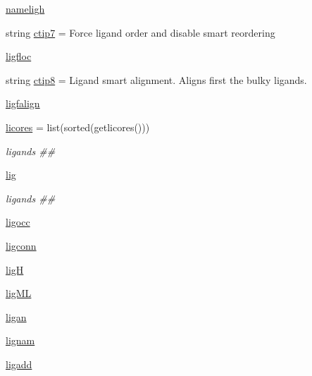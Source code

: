 \begin{DoxyCompactItemize}
\hyperlink{classmolSimplify_1_1Classes_1_1mGUI_1_1mGUI_a914adc23a74fe3fff6dbc2411ef1c77a}{nameligh}
\item 
string \hyperlink{classmolSimplify_1_1Classes_1_1mGUI_1_1mGUI_aed11e30715fd7bc36a119508a8a3a6d3}{ctip7} = \textquotesingle{}Force ligand order and disable smart reordering\textquotesingle{}
\item 
\hyperlink{classmolSimplify_1_1Classes_1_1mGUI_1_1mGUI_a33b3e0043207aa385e0d579afd7a2d81}{ligfloc}
\item 
string \hyperlink{classmolSimplify_1_1Classes_1_1mGUI_1_1mGUI_a2c8217bf3709b8acfc4c478e5834f57b}{ctip8} = \textquotesingle{}Ligand smart alignment. Aligns first the bulky ligands.\textquotesingle{}
\item 
\hyperlink{classmolSimplify_1_1Classes_1_1mGUI_1_1mGUI_aeb61d0faab4f971ec11e97b23cd1fab6}{ligfalign}
\item 
\hyperlink{classmolSimplify_1_1Classes_1_1mGUI_1_1mGUI_abc2ed04d4ad77fe4283b3573aa4e6ed0}{licores} = list(sorted(getlicores()))
\begin{DoxyCompactList}\small\item\em ligands \#\# \end{DoxyCompactList}\item 
\hyperlink{classmolSimplify_1_1Classes_1_1mGUI_1_1mGUI_af185bb8c62bdf8be78abd02fc14e41a0}{lig}
\begin{DoxyCompactList}\small\item\em ligands \#\# \end{DoxyCompactList}\item 
\hyperlink{classmolSimplify_1_1Classes_1_1mGUI_1_1mGUI_ae3ab48964e47645e3e2d558848ead2c5}{ligocc}
\item 
\hyperlink{classmolSimplify_1_1Classes_1_1mGUI_1_1mGUI_a85d43f8090604fc315ff57c05b6333d7}{ligconn}
\item 
\hyperlink{classmolSimplify_1_1Classes_1_1mGUI_1_1mGUI_a4b693a39b5434cd7cb5291d5ca2a7631}{ligH}
\item 
\hyperlink{classmolSimplify_1_1Classes_1_1mGUI_1_1mGUI_abf58771c0ae78e9546118ecd1c3180bd}{lig\+ML}
\item 
\hyperlink{classmolSimplify_1_1Classes_1_1mGUI_1_1mGUI_a5779654cffe742295c860ef2a5e85dc5}{ligan}
\item 
\hyperlink{classmolSimplify_1_1Classes_1_1mGUI_1_1mGUI_a4949cd1de16bf47dcfc1874d68b9eb40}{lignam}
\item 
\hyperlink{classmolSimplify_1_1Classes_1_1mGUI_1_1mGUI_a83206ce019cc6b0f724ff8333e80b40f}{ligadd}
\item 

\end{DoxyCompactItemize}
